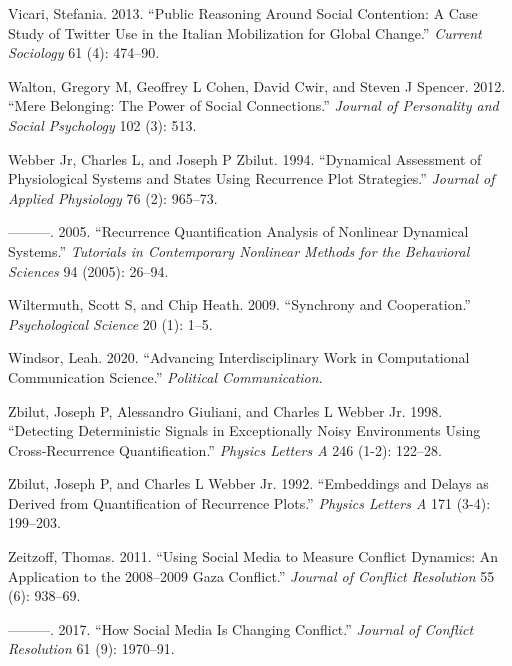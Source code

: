 \documentclass[
  english,
  man]{apa6}
\begin{document}
\leavevmode\hypertarget{ref-vicari2013public}{}%
Vicari, Stefania. 2013. ``Public Reasoning Around Social Contention: A Case Study of Twitter Use in the Italian Mobilization for Global Change.'' \emph{Current Sociology} 61 (4): 474--90.

\leavevmode\hypertarget{ref-walton2012mere}{}%
Walton, Gregory M, Geoffrey L Cohen, David Cwir, and Steven J Spencer. 2012. ``Mere Belonging: The Power of Social Connections.'' \emph{Journal of Personality and Social Psychology} 102 (3): 513.

\leavevmode\hypertarget{ref-webber1994dynamical}{}%
Webber Jr, Charles L, and Joseph P Zbilut. 1994. ``Dynamical Assessment of Physiological Systems and States Using Recurrence Plot Strategies.'' \emph{Journal of Applied Physiology} 76 (2): 965--73.

\leavevmode\hypertarget{ref-webber2005recurrence}{}%
---------. 2005. ``Recurrence Quantification Analysis of Nonlinear Dynamical Systems.'' \emph{Tutorials in Contemporary Nonlinear Methods for the Behavioral Sciences} 94 (2005): 26--94.

\leavevmode\hypertarget{ref-wiltermuth2009synchrony}{}%
Wiltermuth, Scott S, and Chip Heath. 2009. ``Synchrony and Cooperation.'' \emph{Psychological Science} 20 (1): 1--5.

\leavevmode\hypertarget{ref-Windsor2020}{}%
Windsor, Leah. 2020. ``Advancing Interdisciplinary Work in Computational Communication Science.'' \emph{Political Communication}.

\leavevmode\hypertarget{ref-zbilut1998detecting}{}%
Zbilut, Joseph P, Alessandro Giuliani, and Charles L Webber Jr. 1998. ``Detecting Deterministic Signals in Exceptionally Noisy Environments Using Cross-Recurrence Quantification.'' \emph{Physics Letters A} 246 (1-2): 122--28.

\leavevmode\hypertarget{ref-zbilut1992embeddings}{}%
Zbilut, Joseph P, and Charles L Webber Jr. 1992. ``Embeddings and Delays as Derived from Quantification of Recurrence Plots.'' \emph{Physics Letters A} 171 (3-4): 199--203.

\leavevmode\hypertarget{ref-zeitzoff2011using}{}%
Zeitzoff, Thomas. 2011. ``Using Social Media to Measure Conflict Dynamics: An Application to the 2008--2009 Gaza Conflict.'' \emph{Journal of Conflict Resolution} 55 (6): 938--69.

\leavevmode\hypertarget{ref-zeitzoff2017social}{}%
---------. 2017. ``How Social Media Is Changing Conflict.'' \emph{Journal of Conflict Resolution} 61 (9): 1970--91.

\endgroup
\end{document}
